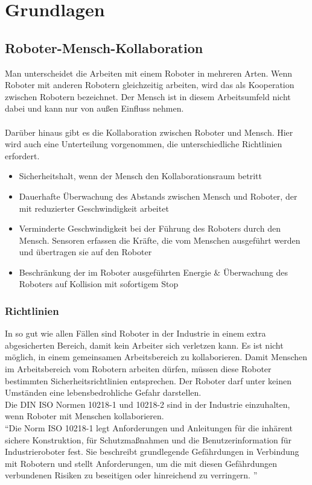 \chapter{Grundlagen}

\section{Roboter-Mensch-Kollaboration}
\label{sec:roboter-mensch-kollaboration_gru}

Man unterscheidet die Arbeiten mit einem Roboter in mehreren Arten.
Wenn Roboter mit anderen Robotern gleichzeitig arbeiten, wird das als Kooperation zwischen Robotern bezeichnet.
Der Mensch ist in diesem Arbeitsumfeld nicht dabei und kann nur von außen Einfluss nehmen.
\\\\
Darüber hinaus gibt es die Kollaboration zwischen Roboter und Mensch.
Hier wird auch eine Unterteilung vorgenommen, die unterschiedliche Richtlinien erfordert.

\begin{itemize}
\item Sicherheitshalt, wenn der Mensch den Kollaborationsraum betritt
\item Dauerhafte Überwachung des Abstands zwischen Mensch und Roboter, der mit reduzierter Geschwindigkeit arbeitet
\item Verminderte Geschwindigkeit bei der Führung des Roboters durch den Mensch. Sensoren erfassen die Kräfte, die vom Menschen ausgeführt werden und übertragen sie auf den Roboter
\item Beschränkung der im Roboter ausgeführten Energie \& Überwachung des Roboters auf Kollision mit sofortigem Stop
\end{itemize}

\subsection{Richtlinien}
\label{kol_richtlinien_gru}

In so gut wie allen Fällen sind Roboter in der Industrie in einem extra abgesicherten Bereich, damit kein Arbeiter sich verletzen kann. Es ist nicht möglich, in einem gemeinsamen Arbeitsbereich zu kollaborieren.
Damit Menschen im Arbeitsbereich vom Robotern arbeiten dürfen, müssen diese Roboter bestimmten Sicherheitsrichtlinien entsprechen.
Der Roboter darf unter keinen Umständen eine lebensbedrohliche Gefahr darstellen. \\ Die DIN ISO Normen 10218-1 und 10218-2 sind in der Industrie einzuhalten, wenn Roboter mit Menschen kollaborieren.
\\
``Die Norm ISO 10218-1 legt Anforderungen und Anleitungen für die inhärent sichere Konstruktion, für Schutzmaßnahmen und die Benutzerinformation für Industrieroboter fest. Sie beschreibt grundlegende Gefährdungen in Verbindung mit Robotern und stellt Anforderungen, um die mit diesen Gefährdungen verbundenen Risiken zu beseitigen oder hinreichend zu verringern. '' \cite{DINISO-2012}

